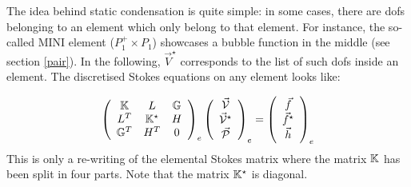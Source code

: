 
The idea behind static condensation is quite simple: in some cases, there are dofs 
belonging to an element which only belong to that element. For instance, the so-called MINI 
element ($P_1^+ \times P_1$) showcases a bubble function in the middle (see section \ref{pair}). 
In the following, $\vec{V}^\star$ corresponds to the list of such dofs inside an element.
The discretised Stokes equations on any element looks like:

\begin{equation}
\left(
\begin{array}{ccc}
{\mathbb{K}}   & L & {\mathbb{G}} \\
L^T & {\mathbb{K}}^\star  & H \\
{\mathbb{G}}^T & H^T & 0
\end{array}
\right)_e
\left(
\begin{array}{c}
\vec{\cal V} \\ \vec{\cal V}^\star \\ \vec{\cal P}
\end{array}
\right)_e
=
\left(
\begin{array}{c}
\vec{f} \\ \vec{f}^\star \\ \vec{h}
\end{array}
\right)_e
\end{equation}
This is only a re-writing of the elemental Stokes matrix where the matrix ${\mathbb{K}}$ has been 
split in four parts.
Note that the matrix ${\mathbb{K}}^\star$ is diagonal.

